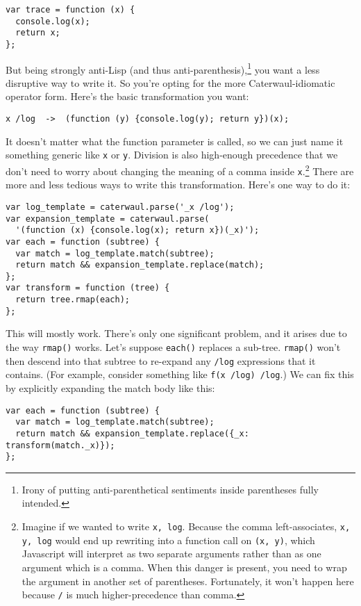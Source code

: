 \documentclass{report}
\begin{document}
\begin{verbatim}
var trace = function (x) {
  console.log(x);
  return x;
};
\end{verbatim}

    But being strongly anti-Lisp (and thus anti-parenthesis),\footnote{Irony of putting anti-parenthetical sentiments inside parentheses fully intended.} you want a less disruptive way to
    write it. So you're opting for the more Caterwaul-idiomatic operator form. Here's the basic transformation you want:

\begin{verbatim}
x /log  ->  (function (y) {console.log(y); return y})(x);
\end{verbatim}

    It doesn't matter what the function parameter is called, so we can just name it something generic like {\tt x} or {\tt y}. Division is also high-enough precedence that we don't need to
    worry about changing the meaning of a comma inside {\tt x}.\footnote{Imagine if we wanted to write {\tt x, log}. Because the comma left-associates, {\tt x, y, log} would end up rewriting
    into a function call on {\tt (x, y)}, which Javascript will interpret as two separate arguments rather than as one argument which is a comma. When this danger is present, you need to wrap
    the argument in another set of parentheses. Fortunately, it won't happen here because {\tt /} is much higher-precedence than comma.} There are more and less tedious ways to write this
    transformation. Here's one way to do it:

\begin{verbatim}
var log_template = caterwaul.parse('_x /log');
var expansion_template = caterwaul.parse(
  '(function (x) {console.log(x); return x})(_x)');
var each = function (subtree) {
  var match = log_template.match(subtree);
  return match && expansion_template.replace(match);
};
var transform = function (tree) {
  return tree.rmap(each);
};
\end{verbatim}

    This will mostly work. There's only one significant problem, and it arises due to the way {\tt rmap()} works. Let's suppose {\tt each()} replaces a sub-tree. {\tt rmap()} won't then
    descend into that subtree to re-expand any {\tt /log} expressions that it contains. (For example, consider something like {\tt f(x /log) /log}.) We can fix this by explicitly expanding the
    match body like this:

\begin{verbatim}
var each = function (subtree) {
  var match = log_template.match(subtree);
  return match && expansion_template.replace({_x: transform(match._x)});
};
\end{verbatim}
\end{document}
